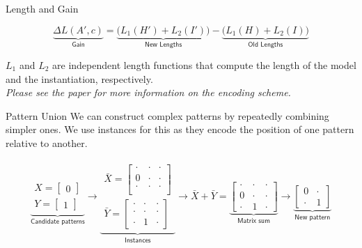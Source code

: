 \documentclass[11pt]{beamer}
\begin{document}

\begin{frame}{Length and Gain}

$$
	\underbrace{\Delta L(A',c)}_{\textsf{Gain}} = \underbrace{\Big(L_1(H') + L_2(I') \Big)}_{\textsf{New Lengths}} - \underbrace{\Big(L_1(H) + L_2(I) \Big)}_{\textsf{Old Lengths}}
$$

\small $L_1$ and $L_2$ are independent length functions that compute the length of the model and the instantiation, respectively. \\ \medskip
\emph{Please see the paper for more information on the encoding scheme.}


\end{frame}



\begin{frame}{Pattern Union}
We can construct complex patterns by repeatedly combining simpler ones. We use instances for this as they encode the position of one pattern relative to another.

\begin{align*}
\underbrace{
\begin{matrix}
X = \begin{bmatrix}
0
\end{bmatrix} \\[1.0em]
Y = \begin{bmatrix}
1
\end{bmatrix}
\end{matrix}}_{\textsf{Candidate patterns}}
\longrightarrow
\underbrace{\begin{matrix}
\bar{X} = \begin{bmatrix}
\cdot  & \cdot & \cdot \\
0 & \cdot & \cdot \\
\cdot & \cdot & \cdot \\
\end{bmatrix} \\[1.0em]
\bar{Y} = \begin{bmatrix}
\cdot  & \cdot & \cdot \\
\cdot  & \cdot & \cdot \\
\cdot & 1 & \cdot
\end{bmatrix}
\end{matrix}}_{\textsf{Instances}}
\longrightarrow
\bar{X}+\bar{Y} =
\underbrace{
\begin{bmatrix}
\cdot  & \cdot & \cdot \\
0  & \cdot & \cdot \\
\cdot & 1 & \cdot
\end{bmatrix}}_{\textsf{Matrix sum}}
\longrightarrow
\underbrace{
\begin{bmatrix}
0  & \cdot \\
\cdot & 1 
\end{bmatrix}}_{\textsf{New pattern}}
\end{align*}
\end{frame}
\end{document}
